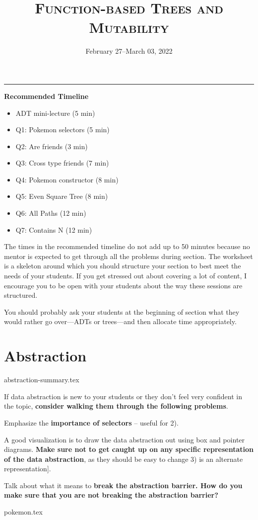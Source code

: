 \documentclass{exam}
\title{\textsc{Function-based Trees and Mutability}}
\date{February 27--March 03, 2022}
\begin{document}
\maketitle
\rule{\textwidth}{0.15em}
\fontsize{12}{15}\selectfont


\begin{meta}
\textbf{Recommended Timeline}
\begin{itemize}
    \item ADT mini-lecture (5 min)
    \item Q1: Pokemon selectors (5 min)
    \item Q2: Are friends (3 min)
    \item Q3: Cross type friends (7 min)
    \item Q4: Pokemon constructor (8 min)
    \item Q5: Even Square Tree (8 min)
    \item Q6: All Paths (12 min)
    \item Q7: Contains N (12 min)
\end{itemize}
The times in the recommended timeline do not add up to 50 minutes because no mentor
is expected to get through all the problems during section. The worksheet is a skeleton
around which you should structure your section to best meet the needs of your students.
If you get stressed out about covering a lot of content, I encourage you to be open with
your students about the way these sessions are structured.  

You should probably ask your students at the beginning of section what they would rather go
over---ADTs or trees---and then allocate time appropriately. 
\end{meta}


\section{Abstraction}
{abstraction-summary.tex}
\begin{meta}
    If data abstraction is new to your students or they don't feel very confident in the topic, \textbf{consider walking them through the following problems}.
    
    Emphasize the \textbf{importance of selectors} -- useful for 2).
    
    A good visualization is to draw the data abstraction out using box and pointer diagrams. \textbf{Make sure not to get caught up on any specific representation of the data abstraction}, as they should be easy to change 3) is an alternate representation].
    
    Talk about what it means to \textbf{break the abstraction barrier. How do you make sure that you are not breaking the abstraction barrier?}
    \end{meta}
\begin{questions}
    {pokemon.tex}
\end{questions}
\end{document}
